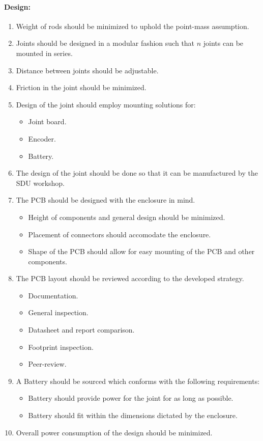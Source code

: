 \paragraph{Design:}
\begin{enumerate}[resume]
	\item Weight of rods should be minimized to uphold the point-mass assumption.
	\label{enum:design_req1}
	\item Joints should be designed in a modular fashion such that $n$ joints can be mounted in series.
	\label{enum:design_req2}
	\item Distance between joints should be adjustable.
	\label{enum:design_req3}
	\item Friction in the joint should be minimized.
	\label{enum:design_req4}
	\item Design of the joint should employ mounting solutions for:
	\label{enum:design_req5}
	\begin{itemize}
		\item Joint board.
		\item Encoder.
		\item Battery. 
	\end{itemize}
	\item The design of the joint should be done so that it can be manufactured by the SDU workshop.
	\label{enum:design_req6}
	\item The PCB should be designed with the enclosure in mind.
	\label{enum:design_req7}
	\begin{itemize}
		\item Height of components and general design should be minimized.
		\item Placement of connectors should accomodate the enclosure.
		\item Shape of the PCB should allow for easy mounting of the PCB and other components.
	\end{itemize}
	\item The PCB layout should be reviewed according to the developed strategy.
	\label{enum:design_req8}
	\begin{itemize}
		\item Documentation.
		\item General inspection.
		\item Datasheet and report comparison.
		\item Footprint inspection.
		\item Peer-review.
	\end{itemize}
	\item A Battery should be sourced which conforms with the following requirements:
	\label{enum:design_req9}
	\begin{itemize}
		\item Battery should provide power for the joint for as long as possible.
		\item Battery should fit within the dimensions dictated by the enclosure.
	\end{itemize}
	\item Overall power consumption of the design should be minimized.
	\label{enum:overall_joint_power}
\end{enumerate}
